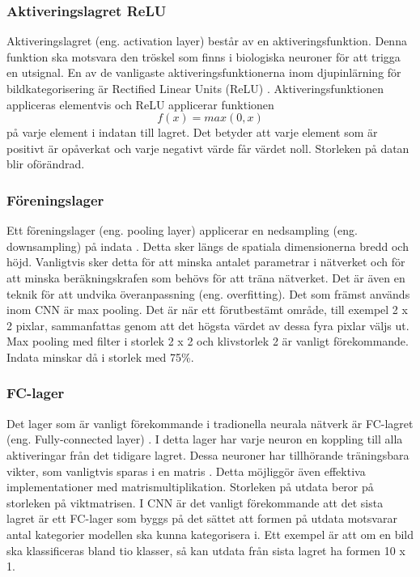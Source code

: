 \documentclass[]{kththesis}
\begin{document}
\subsubsection{Aktiveringslagret ReLU}
Aktiveringslagret (eng. activation layer) består av en aktiveringsfunktion. Denna funktion ska motsvara den tröskel som finns i biologiska neuroner för att trigga en utsignal. En av de vanligaste aktiveringsfunktionerna inom djupinlärning för bildkategorisering är Rectified Linear Units (ReLU) \parencite{krizhevsky2012imagenet}. Aktiveringsfunktionen appliceras elementvis och ReLU applicerar funktionen \begin{equation} f(x) = max(0,x) \end{equation} på varje element i indatan till lagret. Det betyder att varje element som är positivt är opåverkat och varje negativt värde får värdet noll. Storleken på datan blir oförändrad.

\subsubsection{Föreningslager}
Ett föreningslager (eng. pooling layer) applicerar en nedsampling (eng. downsampling) på indata \parencite{krizhevsky2012imagenet}. Detta sker längs de spatiala dimensionerna bredd och höjd. Vanligtvis sker detta för att minska antalet parametrar i nätverket och för att minska beräkningskrafen som behövs för att träna nätverket. Det är även en teknik för att undvika överanpassning (eng. overfitting). Det som främst används inom CNN är max pooling. Det är när ett förutbestämt område, till exempel 2 x 2 pixlar, sammanfattas genom att det högsta värdet av dessa fyra pixlar väljs ut. Max pooling med filter i storlek 2 x 2 och klivstorlek 2 är vanligt förekommande. Indata minskar då i storlek med 75\%.

\subsubsection{FC-lager}
Det lager som är vanligt förekommande i tradionella neurala nätverk är FC-lagret (eng. Fully-connected layer) \parencite{krizhevsky2012imagenet}. I detta lager har varje neuron en koppling till alla aktiveringar från det tidigare lagret. Dessa neuroner har tillhörande träningsbara vikter, som vanligtvis sparas i en matris \parencite{Goodfellow-et-al-2016}. Detta möjliggör även effektiva implementationer med matrismultiplikation. Storleken på utdata beror på storleken på viktmatrisen. I CNN är det vanligt förekommande att det sista lagret är ett FC-lager som byggs på det sättet att formen på utdata motsvarar antal kategorier modellen ska kunna kategorisera i. Ett exempel är att om en bild ska klassificeras bland tio klasser, så kan utdata från sista lagret ha formen 10 x 1.
\end{document}
